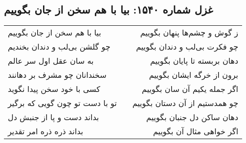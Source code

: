 \begin{center}
\section*{غزل شماره ۱۵۴۰: بیا با هم سخن از جان بگوییم}
\label{sec:1540}
\begin{longtable}{l p{0.5cm} r}
بیا با هم سخن از جان بگوییم
&&
ز گوش و چشم‌ها پنهان بگوییم
\\
چو گلشن بی‌لب و دندان بخندیم
&&
چو فکرت بی‌لب و دندان بگوییم
\\
به سان عقل اول سر عالم
&&
دهان بربسته تا پایان بگوییم
\\
سخندانان چو مشرف بر دهانند
&&
برون از خرگه ایشان بگوییم
\\
کسی با خود سخن پیدا نگوید
&&
اگر جمله یکیم آن سان بگوییم
\\
تو با دست تو چون گویی که برگیر
&&
چو همدستیم از آن دستان بگوییم
\\
بداند دست و پا از جنبش دل
&&
دهان ساکن دل جنبان بگوییم
\\
بداند ذره ذره امر تقدیر
&&
اگر خواهی مثال آن بگوییم
\\
\end{longtable}
\end{center}
